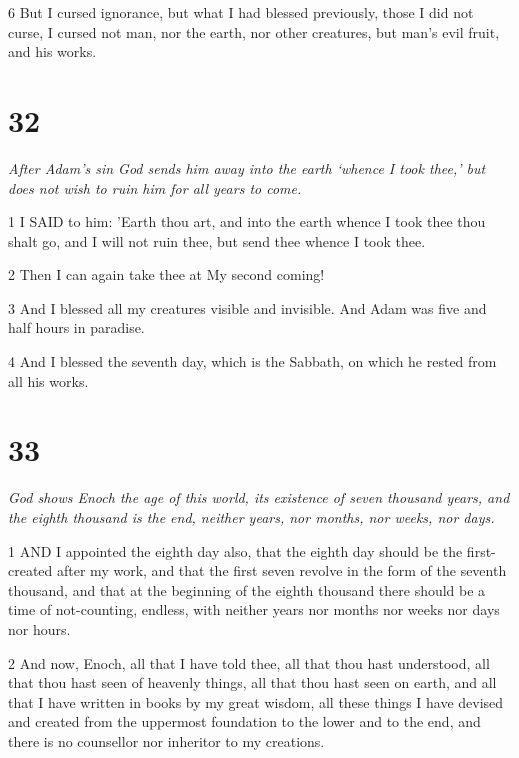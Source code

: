 \par 6 But I cursed ignorance, but what I had blessed previously, those I did not curse, I cursed not man, nor the earth, nor other creatures, but man's evil fruit, and his works.

\chapter{32}

\par \textit{After Adam's sin God sends him away into the earth ‘whence I took thee,’ but does not wish to ruin him for all years to come.}

\par 1 I SAID to him: 'Earth thou art, and into the earth whence I took thee thou shalt go, and I will not ruin thee, but send thee whence I took thee.

\par 2 Then I can again take thee at My second coming!

\par 3 And I blessed all my creatures visible and invisible. And Adam was five and half hours in paradise.

\par 4 And I blessed the seventh day, which is the Sabbath, on which he rested from all his works.

\chapter{33}

\par \textit{God shows Enoch the age of this world, its existence of seven thousand years, and the eighth thousand is the end, neither years, nor months, nor weeks, nor days.}

\par 1 AND I appointed the eighth day also, that the eighth day should be the first-created after my work, and that the first seven revolve in the form of the seventh thousand, and that at the beginning of the eighth thousand there should be a time of not-counting, endless, with neither years nor months nor weeks nor days nor hours.

\par 2 And now, Enoch, all that I have told thee, all that thou hast understood, all that thou hast seen of heavenly things, all that thou hast seen on earth, and all that I have written in books by my great wisdom, all these things I have devised and created from the uppermost foundation to the lower and to the end, and there is no counsellor nor inheritor to my creations.

